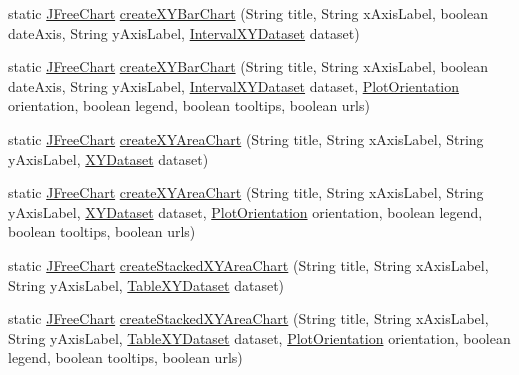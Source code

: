 \begin{DoxyCompactItemize}
\item 
static \mbox{\hyperlink{classorg_1_1jfree_1_1chart_1_1_j_free_chart}{J\+Free\+Chart}} \mbox{\hyperlink{classorg_1_1jfree_1_1chart_1_1_chart_factory_ad107997216e2ff7bd767efaee76777da}{create\+X\+Y\+Bar\+Chart}} (String title, String x\+Axis\+Label, boolean date\+Axis, String y\+Axis\+Label, \mbox{\hyperlink{interfaceorg_1_1jfree_1_1data_1_1xy_1_1_interval_x_y_dataset}{Interval\+X\+Y\+Dataset}} dataset)
\item 
static \mbox{\hyperlink{classorg_1_1jfree_1_1chart_1_1_j_free_chart}{J\+Free\+Chart}} \mbox{\hyperlink{classorg_1_1jfree_1_1chart_1_1_chart_factory_a67985cd742c72e503808dfba7ec892f5}{create\+X\+Y\+Bar\+Chart}} (String title, String x\+Axis\+Label, boolean date\+Axis, String y\+Axis\+Label, \mbox{\hyperlink{interfaceorg_1_1jfree_1_1data_1_1xy_1_1_interval_x_y_dataset}{Interval\+X\+Y\+Dataset}} dataset, \mbox{\hyperlink{classorg_1_1jfree_1_1chart_1_1plot_1_1_plot_orientation}{Plot\+Orientation}} orientation, boolean legend, boolean tooltips, boolean urls)
\item 
static \mbox{\hyperlink{classorg_1_1jfree_1_1chart_1_1_j_free_chart}{J\+Free\+Chart}} \mbox{\hyperlink{classorg_1_1jfree_1_1chart_1_1_chart_factory_a64d65b580ab3667da0d7822810951d2e}{create\+X\+Y\+Area\+Chart}} (String title, String x\+Axis\+Label, String y\+Axis\+Label, \mbox{\hyperlink{interfaceorg_1_1jfree_1_1data_1_1xy_1_1_x_y_dataset}{X\+Y\+Dataset}} dataset)
\item 
static \mbox{\hyperlink{classorg_1_1jfree_1_1chart_1_1_j_free_chart}{J\+Free\+Chart}} \mbox{\hyperlink{classorg_1_1jfree_1_1chart_1_1_chart_factory_ae637db7b08ed6b8261615c2de7a0712d}{create\+X\+Y\+Area\+Chart}} (String title, String x\+Axis\+Label, String y\+Axis\+Label, \mbox{\hyperlink{interfaceorg_1_1jfree_1_1data_1_1xy_1_1_x_y_dataset}{X\+Y\+Dataset}} dataset, \mbox{\hyperlink{classorg_1_1jfree_1_1chart_1_1plot_1_1_plot_orientation}{Plot\+Orientation}} orientation, boolean legend, boolean tooltips, boolean urls)
\item 
static \mbox{\hyperlink{classorg_1_1jfree_1_1chart_1_1_j_free_chart}{J\+Free\+Chart}} \mbox{\hyperlink{classorg_1_1jfree_1_1chart_1_1_chart_factory_a88f2e01963adacb29ea540540fe0ac64}{create\+Stacked\+X\+Y\+Area\+Chart}} (String title, String x\+Axis\+Label, String y\+Axis\+Label, \mbox{\hyperlink{interfaceorg_1_1jfree_1_1data_1_1xy_1_1_table_x_y_dataset}{Table\+X\+Y\+Dataset}} dataset)
\item 
static \mbox{\hyperlink{classorg_1_1jfree_1_1chart_1_1_j_free_chart}{J\+Free\+Chart}} \mbox{\hyperlink{classorg_1_1jfree_1_1chart_1_1_chart_factory_aa79fd2e18c0a4f3ff598c0ac595b6b50}{create\+Stacked\+X\+Y\+Area\+Chart}} (String title, String x\+Axis\+Label, String y\+Axis\+Label, \mbox{\hyperlink{interfaceorg_1_1jfree_1_1data_1_1xy_1_1_table_x_y_dataset}{Table\+X\+Y\+Dataset}} dataset, \mbox{\hyperlink{classorg_1_1jfree_1_1chart_1_1plot_1_1_plot_orientation}{Plot\+Orientation}} orientation, boolean legend, boolean tooltips, boolean urls)

\end{DoxyCompactItemize}
